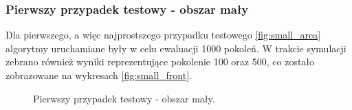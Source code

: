 \documentclass[twoside]{iisthesis}
\begin{document}
\subsubsection{Pierwszy przypadek testowy - obszar mały}
Dla pierwszego, a więc najprostszego przypadku testowego \eqref{fig:small_area} algorytmy uruchamiane były w celu ewaluacji 1000 pokoleń. W trakcie symulacji zebrano również wyniki reprezentujące pokolenie 100 oraz 500, co zostało zobrazowane na wykresach \eqref{fig:small_front}.
\begin{figure}[H]
	\centering
	\caption{Pierwszy przypadek testowy - obszar mały.}
	\label{fig:small_area}
\end{figure}
\end{document}
